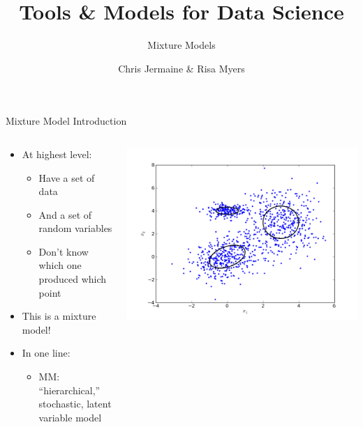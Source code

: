 \documentclass[aspectratio=169]{beamer}
\title[]
{Tools \& Models for Data Science}
\subtitle{Mixture Models}
\author[]{Chris Jermaine \& Risa Myers}
\institute
{
  Rice University 
}
\date[]{}
\begin{document}
\begin{frame}
 \titlepage
\end{frame}
\begin{frame}{Mixture Model Introduction}

\begin{columns}
\begin{column}{0.5\textwidth}
\begin{itemize}
	\item At highest level:
	\begin{itemize}
		\item Have a set of data
		\item And a set of random variables
		\item Don't know which one produced which point
	\end{itemize}
	\item This is a mixture model!
	\item In one line:
	\begin{itemize}
		\item MM: ``hierarchical,'' stochastic, latent variable model
	\end{itemize}
\end{itemize}
\end{column}
\begin{column}{0.5\textwidth}
\includegraphics[width=1\textwidth]{lectMM/sample_gmm.png}
\end{column}
\end{columns}

\end{frame}
\end{document}
